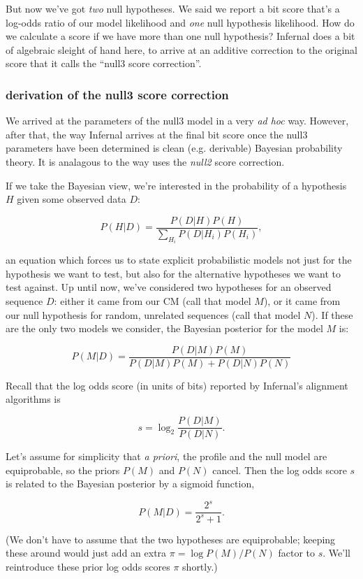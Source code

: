 But now we've got \emph{two} null hypotheses. We said we report a bit
score that's a log-odds ratio of our model likelihood and \emph{one}
null hypothesis likelihood. How do we calculate a score if we have
more than one null hypothesis? Infernal does a bit of algebraic sleight
of hand here, to arrive at an additive correction to the original
score that it calls the ``null3 score correction''. 

\subsubsection{derivation of the null3 score correction}

We arrived at the parameters of the null3 model in a very \emph{ad
hoc} way. However, after that, the way Infernal arrives at the final bit
score once the null3 parameters have been determined is clean
(e.g. derivable) Bayesian probability theory. It is analagous to the
way  uses the \emph{null2} score correction.

If we take the Bayesian view, we're interested in the probability of a
hypothesis $H$ given some observed data $D$:

\[
   P(H | D) = \frac{P(D | H) P(H)}{\sum_{H_i} P(D | H_i) P(H_i)},
\]

an equation which forces us to state explicit probabilistic models not
just for the hypothesis we want to test, but also for the alternative
hypotheses we want to test against. Up until now, we've considered two
hypotheses for an observed sequence $D$: either it came from our
CM (call that model $M$), or it came from our null hypothesis
for random, unrelated sequences (call that model $N$). If these are
the only two models we consider, the Bayesian posterior for the model
$M$ is:

\[
   P(M | D) = \frac{P(D | M) P(M)}{P(D | M) P(M) + P(D | N) P(N)}
\]

Recall that the log odds score (in units of bits) reported by
Infernal's alignment algorithms is

\[
  s = \log_2 \frac{P(D | M)}{P(D | N)}.
\]

Let's assume for simplicity that \emph{a priori}, the profile and the
null model are equiprobable, so the priors $P(M)$ and $P(N)$
cancel. Then the log odds score $s$ is related to the Bayesian
posterior by a sigmoid function,

\[
  P(M | D) = \frac{2^s}{2^s + 1}.
\]

(We don't have to assume that the two hypotheses are equiprobable;
keeping these around would just add an extra $\pi = \log P(M) / P(N)$
factor to $s$. We'll reintroduce these prior log odds scores $\pi$
shortly.)

